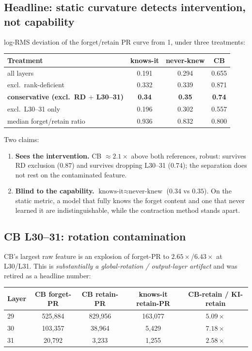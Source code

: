 \documentclass[11pt]{article}
\begin{document}
\subsection{Headline: static curvature detects intervention, not capability}
log-RMS deviation of the forget/retain PR curve from 1, under three treatments:
\begin{center}
\begin{tabular}{lccc}
\toprule
Treatment & knows-it & never-knew & CB \\
\midrule
all layers                 & 0.191 & 0.294 & 0.655 \\
excl.\ rank-deficient      & 0.332 & 0.339 & 0.871 \\
\textbf{conservative (excl.\ RD $+$ L30--31)} & \textbf{0.34} & \textbf{0.35} & \textbf{0.74} \\
excl.\ L30--31 only        & 0.196 & 0.302 & 0.557 \\
median forget/retain ratio & 0.936 & 0.832 & 0.800 \\
\bottomrule
\end{tabular}
\end{center}

\noindent Two claims:
\begin{enumerate}[leftmargin=1.6em,itemsep=1pt]
  \item \textbf{Sees the intervention.} CB $\approx 2.1\times$ above both references, robust:
        survives RD exclusion ($0.87$) and survives dropping L30--31 ($0.74$); the separation does
        not rest on the contaminated feature.
  \item \textbf{Blind to the capability.} $\text{knows-it} \approx \text{never-knew}$
        ($0.34$ vs $0.35$). On the static metric, a model that fully knows the forget content and
        one that never learned it are indistinguishable, while the contraction method stands
        apart. 


\end{enumerate}

\subsection{CB L30--31: rotation contamination}\label{sec:cbcontam}
CB's largest raw feature is an explosion of forget-PR to $2.65\times$/$6.43\times$ at L30/L31. This
is \emph{substantially a global-rotation / output-layer artifact} and was retired as a headline
number:
\begin{center}
\begin{tabular}{lcccc}
\toprule
Layer & CB forget-PR & CB retain-PR & knows-it retain-PR & CB-retain / KI-retain \\
\midrule
29 & 525{,}884 & 829{,}956 & 163{,}077 & $5.09\times$ \\
30 & 103{,}357 & 38{,}964 & 5{,}429 & $7.18\times$ \\
31 & 20{,}792 & 3{,}233 & 1{,}255 & $2.58\times$ \\
\bottomrule
\end{tabular}
\end{center}
\end{document}
